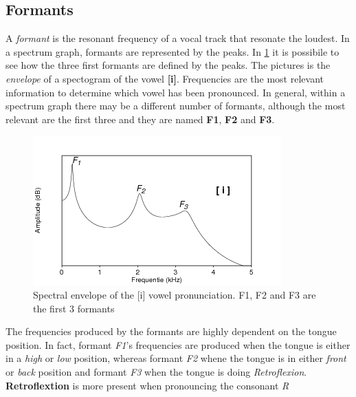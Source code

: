 
\subsection{Formants}
\label{sub:formants}
A \textit{formant} is the resonant frequency of a vocal track that resonate the loudest. In a spectrum graph, formants are represented by the peaks. In \ref{fig:peaks_formants} it is possibile to see how the three first formants are defined by the peaks. The pictures is the \textit{envelope} of a spectogram of the vowel \textbf{[i]}. Frequencies are the most relevant information to determine which vowel has been pronounced. In general, within a spectrum graph there may be a different number of formants, although the most relevant are the first three and they are named \textbf{F1}, \textbf{F2} and \textbf{F3}.

\begin{figure}[!ht]
    \centering
    \includegraphics[scale=0.6]{Figures/peaks_formants.png}
    \caption{Spectral envelope of the [i] vowel pronunciation. F1, F2 and F3 are the first 3 formants \cite{formants_peaks}}
    \label{fig:peaks_formants}
\end{figure}

\noindent The frequencies produced by the formants are highly dependent on the tongue position. In fact, formant \textit{F1}'s frequencies are produced when the tongue is either in a \textit{high} or \textit{low} position, whereas formant \textit{F2} whene the tongue is in either \textit{front} or \textit{back} position and formant \textit{F3} when the tongue is doing \textit{Retroflexion}. \textbf{Retroflextion} is more present when pronouncing the consonant \textit{R}


